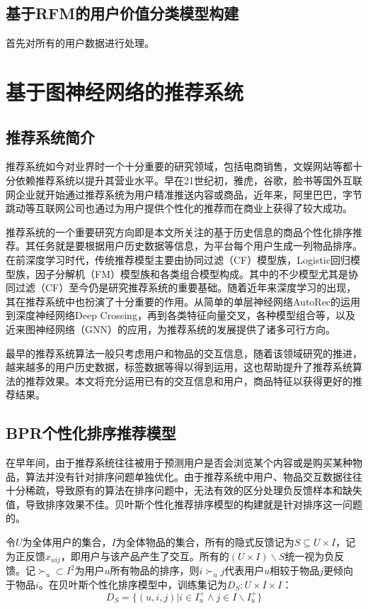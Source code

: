 \documentclass[lang=cn,11pt,a4paper,cite=authoryear]{elegantpaper}
\begin{document}
\subsection{基于RFM的用户价值分类模型构建}
首先对所有的用户数据进行处理。

\section{基于图神经网络的推荐系统}

\subsection{推荐系统简介}

推荐系统如今对业界时一个十分重要的研究领域，包括电商销售，文娱网站等都十分依赖推荐系统以提升其营业水平。早在21世纪初，雅虎，谷歌，脸书等国外互联网企业就开始通过推荐系统为用户精准推送内容或商品，近年来，阿里巴巴，字节跳动等互联网公司也通过为用户提供个性化的推荐而在商业上获得了较大成功。

推荐系统的一个重要研究方向即是本文所关注的基于历史信息的商品个性化排序推荐。其任务就是要根据用户历史数据等信息，为平台每个用户生成一列物品排序。在前深度学习时代，传统推荐模型主要由协同过滤（CF）模型族，Logistic回归模型族，因子分解机（FM）模型族和各类组合模型构成。其中的不少模型尤其是协同过滤（CF）至今仍是研究推荐系统的重要基础。随着近年来深度学习的出现，其在推荐系统中也扮演了十分重要的作用。从简单的单层神经网络AutoRec的运用到深度神经网络Deep Crossing，再到各类特征向量交叉，各种模型组合等，以及近来图神经网络（GNN）的应用，为推荐系统的发展提供了诸多可行方向。

最早的推荐系统算法一般只考虑用户和物品的交互信息，随着该领域研究的推进，越来越多的用户历史数据，标签数据等得以得到运用，这也帮助提升了推荐系统算法的推荐效果。本文将充分运用已有的交互信息和用户，商品特征以获得更好的推荐结果。

\subsection{BPR个性化排序推荐模型}
在早年间，由于推荐系统往往被用于预测用户是否会浏览某个内容或是购买某种物品，算法并没有针对排序问题单独优化。由于推荐系统中用户、物品交互数据往往十分稀疏，导致原有的算法在排序问题中，无法有效的区分处理负反馈样本和缺失值，导致排序效果不佳。贝叶斯个性化推荐排序模型的构建就是针对排序这一问题的。

令$U$为全体用户的集合，$I$为全体物品的集合，所有的隐式反馈记为$S \subseteq U \times I$，记为正反馈$x_{uij}$，即用户与该产品产生了交互。所有的$(U \times I) \backslash S$统一视为负反馈。记$\succ_u \subset I^2$为用户$u$所有物品的排序，则$i \succ_u j$代表用户$u$相较于物品$j$更倾向于物品$i$。在贝叶斯个性化排序模型中，训练集记为$D_S : U \times I \times I$：
\begin{equation}
  D_S = \{ (u, i, j) | i \in I_u^+ \wedge j \in I \backslash I_u^+\}
\end{equation}
\end{document}
